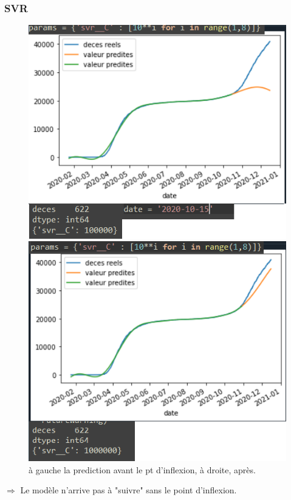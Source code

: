 \documentclass{beamer}
\begin{document}
\begin{frame}
	\frametitle{SVR}
	\begin{figure}[t]
		\centering
		\begin{minipage}{0.5\textwidth}
			\includegraphics[scale=0.25]{SVR_avant_pt_dinflexion}
		\end{minipage}%
		\begin{minipage}{0.5\textwidth}
			\includegraphics[scale=0.25]{SVR_apres_pt_dinflexion}
		\end{minipage}
	\caption{à gauche la prediction avant le pt d'inflexion, à droite, après.}
	\end{figure}
	$\Rightarrow$ Le modèle n'arrive pas à "suivre" sans le point d'inflexion.
\end{frame}
\end{document}
